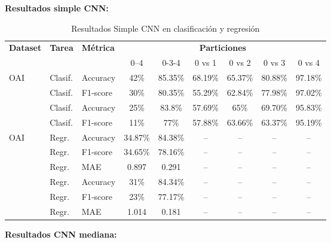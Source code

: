 \documentclass[11pt,spanish,listoffigures,listoftables]{tfgetsinf}
\begin{document}
\textbf{Resultados simple CNN:}

\begin{table}[h]
    \centering
    \caption{Resultados Simple CNN en clasificación y regresión}
    \label{tab:simple_cnn_results_improved}
    \begin{tabular}{@{} l l l c c c c c c @{}} 
      \toprule
      \textbf{Dataset} & \textbf{Tarea} & \textbf{Métrica} 
        & \multicolumn{6}{c}{\textbf{Particiones}} \\
      \cmidrule(lr){4-9}
      & & & 0--4 & 0-3-4 & 0 vs 1 & 0 vs 2 & 0 vs 3 & 0 vs 4 \\
      \midrule
      \multirow{2}{*}{OAI}
        & Clasif. & Accuracy   & 42\%   & 85.35\%   & 68.19\% &  65.37\%   &  80.88\%   &  97.18\%   \\
        & Clasif. & F1-score    & 30\%  & 80.35\%  & 55.29\%  &  62.84\%   &  77.98\%   &  97.02\%   \\
      \addlinespace
      \multirow{2}{*}{Gatos}
        & Clasif. & Accuracy   & 25\%   & 83.8\%  & 57.69\% &  65\%     &  69.70\%   &  95.83\%   \\
        & Clasif. & F1-score    & 11\%  & 77\%    & 57.88\% &  63.66\%  &  63.37\%   &  95.19\%   \\
      \midrule
      \multirow{3}{*}{OAI}
        & Regr.   & Accuracy   & 34.87\%   & 84.38\% &  --      &  --   &  --   &  --   \\
        & Regr.   & F1-score    & 34.65\%  & 78.16\%  &  --      &  --   &  --   &  --   \\
        & Regr.   & MAE         & 0.897  & 0.291  &  --      &  --   &  --   &  --   \\
      \addlinespace
      \multirow{3}{*}{Gatos}
        & Regr.   & Accuracy   & 31\%   & 84.34\%  &  --    &  --   &  --   &  --   \\
        & Regr.   & F1-score    & 23\%  & 77.17\%  &  --    &  --   &  --   &  --   \\
        & Regr.   & MAE         & 1.014  & 0.181   &  --    &  --   &  --   &  --   \\
      \bottomrule
    \end{tabular}
\end{table}
  


\textbf{Resultados CNN mediana:}
\end{document}

